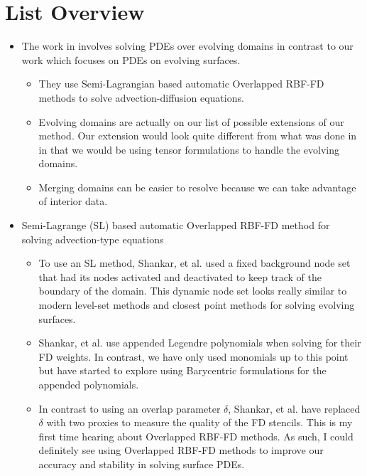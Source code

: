 \documentclass[a4paper,12pt]{article}
\begin{document}
\section*{List Overview}
	\begin{itemize}
		\item The work in \cite{article} involves solving PDEs over evolving domains in contrast to our work which focuses on PDEs on evolving surfaces.
		\begin{itemize}
			\item They use Semi-Lagrangian based automatic Overlapped RBF-FD methods to solve advection-diffusion equations.
			
			\item Evolving domains are actually on our list of possible extensions of our method. Our extension would look quite different from what was done in \cite{article} in that we would be using tensor formulations to handle the evolving domains.
			
			\item Merging domains can be easier to resolve because we can take advantage of interior data.
		\end{itemize}
		
		\item Semi-Lagrange (SL) based automatic Overlapped RBF-FD method for solving advection-type equations
		\begin{itemize}
			\item To use an SL method, Shankar, et al. used a fixed background node set that had its nodes activated and deactivated to keep track of the boundary of the domain. This dynamic node set looks really similar to modern level-set methods and closest point methods for solving evolving surfaces.
			
			\item Shankar, et al. use appended Legendre polynomials when solving for their FD weights. In contrast, we have only used monomials up to this point but have started to explore using Barycentric formulations for the appended polynomials.
			
			\item In contrast to using an overlap parameter $ \delta $, Shankar, et al. have replaced $ \delta $ with two proxies to measure the quality of the FD stencils. This is my first time hearing about Overlapped RBF-FD methods. As such, I could definitely see using Overlapped RBF-FD methods to improve our accuracy and stability in solving surface PDEs.
		\end{itemize}
	\end{itemize}
\end{document}
